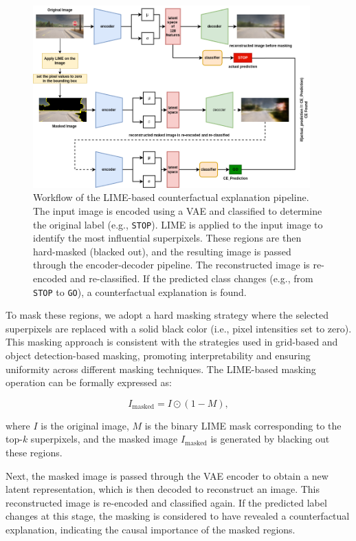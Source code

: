 \begin{figure}[ht]
    \centering
    \includegraphics[width=0.95\textwidth]{img/masking/lime_on_images/lime_on_images_based_masking_flow.drawio.png}
    \caption{
    Workflow of the LIME-based counterfactual explanation pipeline. The input image is encoded using a VAE and classified to determine the original label (e.g., \texttt{STOP}). LIME is applied to the input image to identify the most influential superpixels. These regions are then hard-masked (blacked out), and the resulting image is passed through the encoder-decoder pipeline. The reconstructed image is re-encoded and re-classified. If the predicted class changes (e.g., from \texttt{STOP} to \texttt{GO}), a counterfactual explanation is found.
    }
    \label{fig:lime_image_workflow}
\end{figure}

To mask these regions, we adopt a hard masking strategy where the selected superpixels are replaced with a solid black color (i.e., pixel intensities set to zero). This masking approach is consistent with the strategies used in grid-based and object detection-based masking, promoting interpretability and ensuring uniformity across different masking techniques. The LIME-based masking operation can be formally expressed as:

\[
I_{\text{masked}} = I \odot (1 - M),
\]

where \( I \) is the original image, \( M \) is the binary LIME mask corresponding to the top-$k$ superpixels, and the masked image \( I_{\text{masked}} \) is generated by blacking out these regions.

Next, the masked image is passed through the VAE encoder to obtain a new latent representation, which is then decoded to reconstruct an image. This reconstructed image is re-encoded and classified again. If the predicted label changes at this stage, the masking is considered to have revealed a counterfactual explanation, indicating the causal importance of the masked regions.

